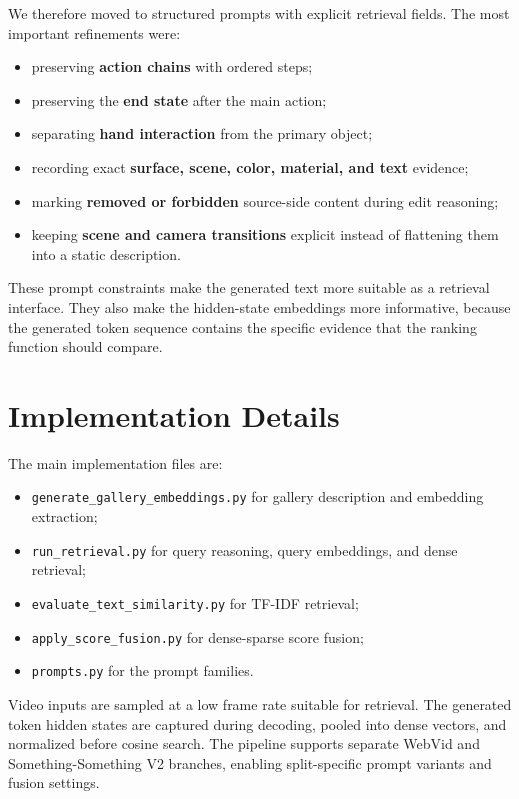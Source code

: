 \documentclass[10pt,twocolumn,letterpaper]{article}
\begin{document}
We therefore moved to structured prompts with explicit retrieval fields.
The most important refinements were:

\begin{itemize}
    \item preserving \textbf{action chains} with ordered steps;
    \item preserving the \textbf{end state} after the main action;
    \item separating \textbf{hand interaction} from the primary object;
    \item recording exact \textbf{surface, scene, color, material, and text} evidence;
    \item marking \textbf{removed or forbidden} source-side content during edit reasoning;
    \item keeping \textbf{scene and camera transitions} explicit instead of flattening them into a static description.
\end{itemize}

These prompt constraints make the generated text more suitable as a retrieval interface.
They also make the hidden-state embeddings more informative, because the generated token sequence contains the specific evidence that the ranking function should compare.

\section{Implementation Details}

The main implementation files are:

\begin{itemize}
    \item \texttt{generate\_gallery\_embeddings.py} for gallery description and embedding extraction;
    \item \texttt{run\_retrieval.py} for query reasoning, query embeddings, and dense retrieval;
    \item \texttt{evaluate\_text\_similarity.py} for TF-IDF retrieval;
    \item \texttt{apply\_score\_fusion.py} for dense-sparse score fusion;
    \item \texttt{prompts.py} for the prompt families.
\end{itemize}

Video inputs are sampled at a low frame rate suitable for retrieval.
The generated token hidden states are captured during decoding, pooled into dense vectors, and normalized before cosine search.
The pipeline supports separate WebVid and Something-Something V2 branches, enabling split-specific prompt variants and fusion settings.
\end{document}
